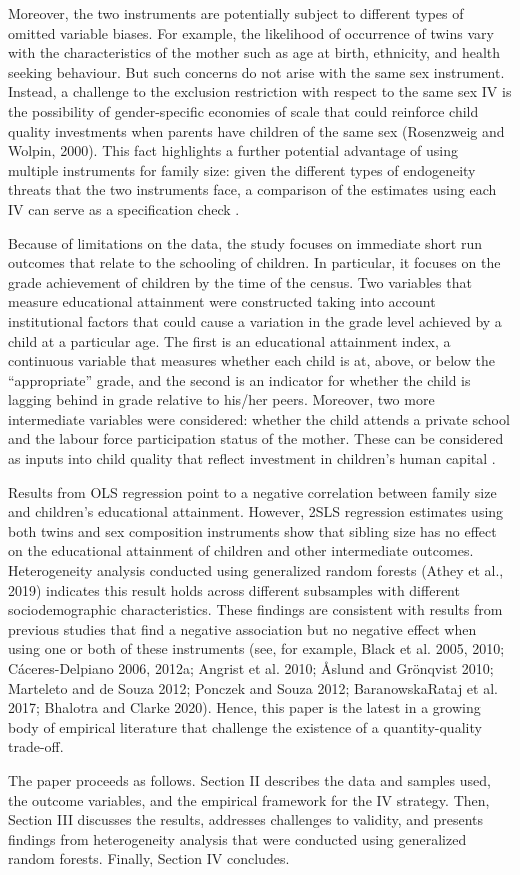 Moreover, the two instruments are potentially subject to different types of omitted variable biases. For example, the likelihood of occurrence of twins vary with the characteristics of the mother such as age at birth, ethnicity, and health seeking behaviour. But such concerns do not arise with the same sex instrument. Instead, a challenge to the exclusion restriction with respect to the same sex IV is the possibility of gender-specific economies of scale that could reinforce child quality investments when parents have children of the same sex (Rosenzweig and Wolpin, 2000). This fact highlights a further potential advantage of using multiple instruments for family size: given the different types of endogeneity threats that the two instruments face, a comparison of the estimates using each IV can serve as a specification check \parencite{angrist_multiple_2010}.

Because of limitations on the data, the study focuses on immediate short run outcomes that relate to the schooling of children. In particular, it focuses on the grade achievement of children by the time of the census. Two variables that measure educational attainment were constructed taking into account institutional factors that could cause a variation in the grade level achieved by a child at a particular age. The first is an educational attainment index, a continuous variable that measures whether each child is at, above, or below the “appropriate” grade, and the second is an indicator for whether the child is lagging behind in grade relative to his/her peers. Moreover, two more intermediate variables were considered: whether the child attends a private school and the labour force participation status of the mother. These can be considered as inputs into child quality that reflect investment in children’s human capital \parencite{caceres-delpiano_impacts_2006}.

Results from OLS regression point to a negative correlation between family size and children’s educational attainment. However, 2SLS regression estimates using both twins and sex composition instruments show that sibling size has no effect on the educational attainment of children and other intermediate outcomes. Heterogeneity analysis conducted using generalized random forests (Athey et al., 2019) indicates this result holds across different subsamples with different sociodemographic characteristics. These findings are consistent with results from previous studies that find a negative association but no negative effect when using one or both of these instruments (see, for example, Black et al. 2005, 2010; Cáceres-Delpiano 2006, 2012a; Angrist et al. 2010; Åslund and Grönqvist 2010; Marteleto and de Souza 2012; Ponczek and Souza 2012; BaranowskaRataj et al. 2017; Bhalotra and Clarke 2020). Hence, this paper is the latest in a growing body of empirical literature that challenge the existence of a quantity-quality trade-off.

The paper proceeds as follows. Section II describes the data and samples used, the outcome variables, and the empirical framework for the IV strategy. Then, Section III discusses the results, addresses challenges to validity, and presents findings from heterogeneity analysis that were conducted using generalized random forests. Finally, Section IV concludes.

